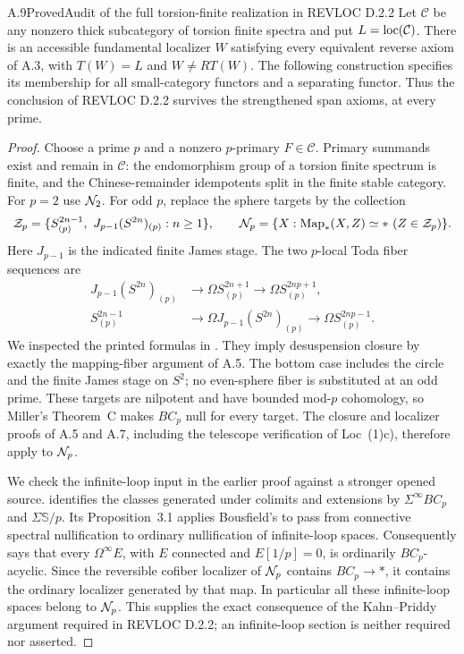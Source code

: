 \begin{claim}{A.9}{Proved}{Audit of the full torsion-finite realization in REVLOC D.2.2}
\label{A9}
Let $\mathcal C$ be any nonzero thick subcategory of torsion finite spectra and put $L=\operatorname{loc}(\mathcal C)$. There is an accessible fundamental localizer $W$ satisfying every equivalent reverse axiom of A.3, with $T(W)=L$ and $W\ne RT(W)$. The following construction specifies its membership for all small-category functors and a separating functor. Thus the conclusion of REVLOC D.2.2 survives the strengthened span axioms, at every prime.
\end{claim}
\begin{proof}
Choose a prime $p$ and a nonzero $p$-primary $F\in\mathcal C$. Primary summands exist and remain in $\mathcal C$: the endomorphism group of a torsion finite spectrum is finite, and the Chinese-remainder idempotents split in the finite stable category. For $p=2$ use $\mathcal N_2$. For odd $p$, replace the sphere targets by the collection
\[
 \mathcal Z_p=\{S^{2n-1}_{(p)},\ J_{p-1}(S^{2n})_{(p)}:n\geq1\},
 \qquad
 \Nul_p=\{X:\Map_*(X,Z)\simeq *\ (Z\in\mathcal Z_p)\}.
\]
Here $J_{p-1}$ is the indicated finite James stage. The two $p$-local Toda fiber sequences are
\begin{align*}
 J_{p-1}(S^{2n})_{(p)}&\longrightarrow\Omega S^{2n+1}_{(p)}
                        \longrightarrow\Omega S^{2np+1}_{(p)},\\
 S^{2n-1}_{(p)}&\longrightarrow\Omega J_{p-1}(S^{2n})_{(p)}
                        \longrightarrow\Omega S^{2np-1}_{(p)}.
\end{align*}
We inspected the printed formulas in \cite[p.~81, proof (ii)]{ABodigheimerHenn}. They imply desuspension closure by exactly the mapping-fiber argument of A.5. The bottom case includes the circle and the finite James stage on $S^2$; no even-sphere fiber is substituted at an odd prime. These targets are nilpotent and have bounded mod-$p$ cohomology, so Miller's Theorem~C makes $BC_p$ null for every target. The closure and localizer proofs of A.5 and A.7, including the telescope verification of Loc~(1)c), therefore apply to $\mathcal N_p$.

We check the infinite-loop input in the earlier proof against a stronger opened source. \cite[Theorem~1.5]{ALevy} identifies the classes generated under colimits and extensions by $\Sigma^\infty BC_p$ and $\Sigma\mathbb S/p$. Its Proposition~3.1 applies Bousfield's \cite[Proposition~3.1]{ABousfield1996} to pass from connective spectral nullification to ordinary nullification of infinite-loop spaces. Consequently \cite[Theorem~3.2]{ALevy} says that every $\Omega^\infty E$, with $E$ connected and $E[1/p]=0$, is ordinarily $BC_p$-acyclic. Since the reversible cofiber localizer of $\mathcal N_p$ contains $BC_p\to *$, it contains the ordinary localizer generated by that map. In particular all these infinite-loop spaces belong to $\mathcal N_p$. This supplies the exact consequence of the Kahn--Priddy argument required in REVLOC D.2.2; an infinite-loop section is neither required nor asserted.


\end{proof}
